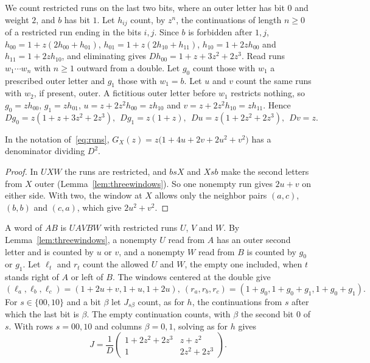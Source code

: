 We count restricted runs on the last two bits, where an outer letter has bit $0$ and weight
$2$, and $b$ has bit $1$. Let $h_{ij}$ count, by $z^n$, the continuations of
length $n\ge0$ of a restricted run ending in the bits $i,j$. Since $b$ is forbidden after $1,j$, $h_{00}=1+z(2h_{00}+h_{01})$, $h_{01}=1+z(2h_{10}+h_{11})$, $h_{10}=1+2zh_{00}$ and
$h_{11}=1+2zh_{10}$, and eliminating gives $Dh_{00}=1+z+3z^2+2z^3$. Read runs $w_1\cdots w_n$
with $n\ge1$ outward from a double. Let $g_0$ count those with $w_1$ a prescribed outer letter and
$g_1$ those with $w_1=b$. Let $u$ and $v$ count the same runs with $w_2$, if present, outer. A fictitious outer letter before $w_1$ restricts nothing, so $g_0=zh_{00}$,
$g_1=zh_{01}$, $u=z+2z^2h_{00}=zh_{10}$ and $v=z+2z^2h_{10}=zh_{11}$. Hence
\begin{equation}\label{eq:runs}
Dg_0=z(1+z+3z^2+2z^3),\ \ Dg_1=z(1+z),\ \ Du=z(1+2z^2+2z^3),\ \ Dv=z.
\end{equation}

\begin{proposition}\label{prop:GX}
In the notation of~\eqref{eq:runs}, $G_X(z)=z\bigl(1+4u+2v+2u^2+v^2\bigr)$ has a denominator
dividing $D^2$.
\end{proposition}

\begin{proof}
In $UXW$ the runs are restricted, and $bsX$ and $Xsb$ make the second letters from $X$ outer
(Lemma~\ref{lem:threewindows}). So one nonempty run gives $2u+v$ on either side. With
two, the window at $X$ allows only the neighbor pairs $(a,c)$, $(b,b)$ and $(c,a)$, which give $2u^2+v^2$.
\end{proof}

A word of $AB$ is $UAVBW$ with restricted runs $U$, $V$ and $W$. By
Lemma~\ref{lem:threewindows}, a nonempty $U$ read from $A$ has an outer second letter and is
counted by $u$ or $v$, and a nonempty $W$ read from $B$ is counted by $g_0$ or $g_1$. Let
$\ell_t$ and $r_t$ count the allowed $U$ and $W$, the empty one included, when $t$ stands
right of $A$ or left of $B$. The windows centered at the double give
\begin{equation}\label{eq:lr}
(\ell_a,\ell_b,\ell_c)=(1+2u+v,1+u,1+2u),\ (r_a,r_b,r_c)=(1+g_0,1+g_0+g_1,1+g_0+g_1).
\end{equation}
For $s\in\{00,10\}$ and a bit $\beta$ let $J_{s\beta}$ count, as for $h$, the continuations
from $s$ after which the last bit is $\beta$. The empty continuation counts, with $\beta$ the
second bit $0$ of $s$. With rows $s=00,10$ and columns $\beta=0,1$, solving as for $h$ gives
\begin{equation}\label{eq:J}
J=\frac1D\begin{pmatrix}1+2z^2+2z^3&z+z^2\\1&2z^2+2z^3\end{pmatrix}.
\end{equation}

